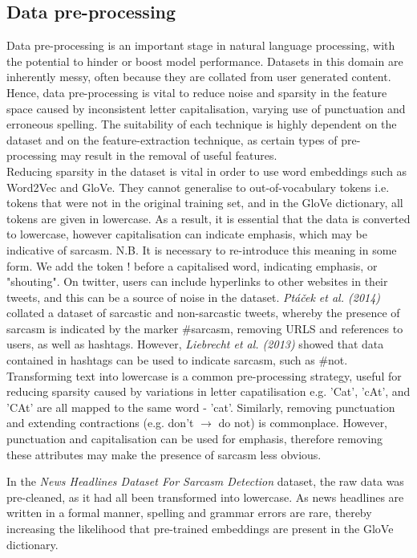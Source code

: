 \documentclass[12pt,a4paper]{article}
\begin{document}
\subsection{Data pre-processing}
\noindent Data pre-processing is an important stage in natural language processing, with the potential to hinder or boost model performance. Datasets in this domain are inherently messy, often because they are collated from user generated content. Hence, data pre-processing is vital to reduce noise and sparsity in the feature space caused by inconsistent letter capitalisation, varying use of punctuation and erroneous spelling. The suitability of each technique is highly dependent on the dataset and on the feature-extraction technique, as certain types of pre-processing may result in the removal of useful features. \\
Reducing sparsity in the dataset is vital in order to use word embeddings such as Word2Vec and GloVe. They cannot generalise to out-of-vocabulary tokens i.e. tokens that were not in the original training set, and in the GloVe dictionary, all tokens are given in lowercase. As a result, it is essential that the data is converted to lowercase, however capitalisation can indicate emphasis, which may be indicative of sarcasm. N.B. It is necessary to re-introduce this meaning in some form. We add the token ! before a capitalised word, indicating emphasis, or "shouting". On twitter, users can include hyperlinks to other websites in their tweets, and this can be a source of noise in the dataset. \textit{Pt{\'a}{\v{c}ek et al. (2014)}} \cite{ptavcek2014sarcasm} collated a dataset of sarcastic and non-sarcastic tweets, whereby the presence of sarcasm is indicated by the marker \#sarcasm, removing URLS and references to users, as well as hashtags. However, \textit{Liebrecht et al. (2013)} \cite{liebrecht2013perfect} showed that data contained in hashtags can be used to indicate sarcasm, such as \#not. Transforming text into lowercase is a common pre-processing strategy, useful for reducing sparsity caused by variations in letter capatilisation e.g. 'Cat', 'cAt', and 'CAt' are all mapped to the same word - 'cat'. Similarly, removing punctuation and extending contractions (e.g. don't $\rightarrow$ do not) is commonplace. However, punctuation and capitalisation can be used for emphasis, therefore removing these attributes may make the presence of sarcasm less obvious.

In the \textit{News Headlines Dataset For Sarcasm Detection} dataset, the raw data was pre-cleaned, as it had all been transformed into lowercase. As news headlines are written in a formal manner, spelling and grammar errors are rare, thereby increasing the likelihood that pre-trained embeddings are present in the GloVe dictionary.
\end{document}
